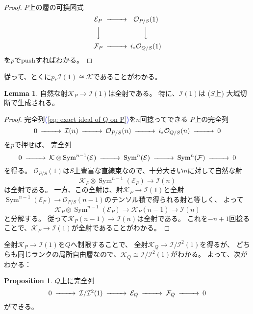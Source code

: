 \documentclass[uplatex]{jsarticle}
\renewcommand{\eqref}[1]{\textcolor{blue}{(\ref{#1})}}
\theoremstyle{definition}
\newtheorem{prop}[prop]{Proposition}
\newtheorem{lem}[lem]{Lemma}
\DeclareMathOperator{\Sym}{\mathrm{Sym}}
\newcommand{\mcE}{\mathcal{E}}
\newcommand{\mcF}{\mathcal{F}}
\newcommand{\mcI}{\mathcal{I}}
\newcommand{\mcK}{\mathcal{K}}
\newcommand{\mcO}{\mathcal{O}}
\newcommand{\OOO}{\mcO}
\newcommand{\OO}[1]{\OOO_{#1}}
\begin{document}
\begin{proof}
  \(P\)上の層の可換図式
  \[
  \begin{CD}
    \mcE_P @>>> \OO{P/S}(1) \\
    @VVV @VVV \\
    \mcF_P @>>> i_*\OO{Q/S}(1)
  \end{CD}
  \]
  を\(p\)でpushすればわかる。
\end{proof}

従って、とくに\(p_*\mcI(1)\cong \mcK\)であることがわかる。

\begin{lem}
  自然な射\(\mcK_P \to \mcI(1)\)は全射である。
  特に、\(\mcI(1)\)は (\(S\)上) 大域切断で生成される。
\end{lem}

\begin{proof}
  完全列\eqref{eq: exact ideal of Q on P}を\(n\)回捻ってできる
  \(P\)上の完全列
  \[
  \begin{CD}
    0 @>>> \mcI(n) @>>> \OO{P/S}(n) @>>> i_*\OO{Q/S}(n) @>>> 0
  \end{CD}
  \]
  を\(p\)で押せば、
  完全列
  \[
  \begin{CD}
    0 @>>> \mcK \otimes \Sym^{n-1}(\mcE) @>>> \Sym^n(\mcE) @>>> \Sym^n(\mcF) @>>> 0
  \end{CD}
  \]
  を得る。
  \(\OO{P/S}(1)\)は\(S\)上豊富な直線束なので、十分大きい\(n\)に対して自然な射
  \[
  \mcK_P \otimes \Sym^{n-1}(\mcE_P) \to \mcI(n)
  \]
  は全射である。
  一方、この全射は、射\(\mcK_P \to \mcI(1)\)と全射
  \(\Sym^{n-1}(\mcE_P)\to \OO{P/S}(n-1)\)のテンソル積で得られる射と等しく、
  よって
  \[
  \mcK_P \otimes \Sym^{n-1}(\mcE_P) \to \mcK_P (n-1) \to \mcI(n)
  \]
  と分解する。
  従って\(\mcK_P (n-1) \to \mcI(n)\)は全射である。
  これを\(-n+1\)回捻ることで、\(\mcK_P\to \mcI(1)\)が全射であることがわかる。
\end{proof}

全射\(\mcK_P\to \mcI(1)\)を\(Q\)へ制限することで、
全射\(\mcK_Q \to \mcI/\mcI^2(1)\)を得るが、
どちらも同じランクの局所自由層なので、\(\mcK_Q\cong \mcI/\mcI^2(1)\)がわかる。
よって、次がわかる：

\begin{prop}
  \(Q\)上に完全列
  \[
  \begin{CD}
    0 @>>> \mcI/\mcI^2(1) @>>> \mcE_Q @>>> \mcF_Q @>>> 0
  \end{CD}
  \]
  ができる。
\end{prop}
\end{document}
